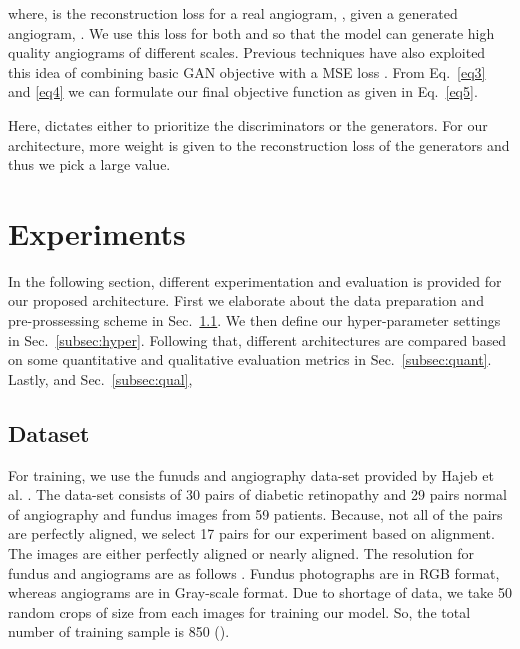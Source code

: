 \documentclass[runningheads]{llncs}
\begin{document}
where,  is the reconstruction loss for a real angiogram, , given a generated angiogram, . We use this loss for both  and  so that the model can generate high quality angiograms of different scales. Previous techniques have also exploited this idea of combining basic GAN objective with a MSE loss \cite{pathak2016context}. From Eq.~\ref{eq3} and \ref{eq4} we can formulate our final objective function as given in Eq.~\ref{eq5}.



Here,  dictates either to prioritize the discriminators or the generators. For our architecture, more weight is given to the reconstruction loss of the generators and thus we pick a large  value.




\section{Experiments}\label{sec:Results}

In the following section, different experimentation and evaluation is provided for our proposed architecture. First we elaborate about the data preparation and pre-prossessing scheme in Sec.~\ref{subsec:dataset}. We then define our hyper-parameter settings in Sec.~\ref{subsec:hyper}. Following that, different architectures are compared based on some quantitative and qualitative evaluation metrics in Sec.~\ref{subsec:quant}. Lastly, and Sec.~\ref{subsec:qual},

\subsection{Dataset}\label{subsec:dataset}
For training, we use the funuds and angiography data-set provided by Hajeb et al. \cite{hajeb2012diabetic}. The data-set consists of 30 pairs of diabetic retinopathy and 29 pairs normal of angiography and fundus images from 59 patients. Because, not all of the pairs are perfectly aligned, we select 17 pairs for our experiment based on alignment. The images are either perfectly aligned or nearly aligned. The resolution for fundus and angiograms are as follows . Fundus photographs are in RGB format, whereas angiograms are in Gray-scale format. Due to shortage of data, we take 50 random crops of size  from each images for training our model. So, the total number of training sample is 850 (). 
\end{document}

